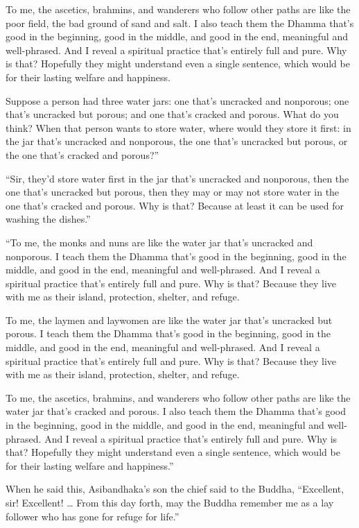 \documentclass[12pt,openany]{book}%
\begin{document}
To me, the ascetics, brahmins, and wanderers who follow other paths are like the poor field, the bad ground of sand and salt. I also teach them the Dhamma that’s good in the beginning, good in the middle, and good in the end, meaningful and well-phrased. And I reveal a spiritual practice that’s entirely full and pure. Why is that? Hopefully they might understand even a single sentence, which would be for their lasting welfare and happiness. 

Suppose a person had three water jars: one that’s uncracked and nonporous; one that’s uncracked but porous; and one that’s cracked and porous. What do you think? When that person wants to store water, where would they store it first: in the jar that’s uncracked and nonporous, the one that’s uncracked but porous, or the one that’s cracked and porous?” 

“Sir, they’d store water first in the jar that’s uncracked and nonporous, then the one that’s uncracked but porous, then they may or may not store water in the one that’s cracked and porous. Why is that? Because at least it can be used for washing the dishes.” 

“To me, the monks and nuns are like the water jar that’s uncracked and nonporous. I teach them the Dhamma that’s good in the beginning, good in the middle, and good in the end, meaningful and well-phrased. And I reveal a spiritual practice that’s entirely full and pure. Why is that? Because they live with me as their island, protection, shelter, and refuge. 

To me, the laymen and laywomen are like the water jar that’s uncracked but porous. I teach them the Dhamma that’s good in the beginning, good in the middle, and good in the end, meaningful and well-phrased. And I reveal a spiritual practice that’s entirely full and pure. Why is that? Because they live with me as their island, protection, shelter, and refuge. 

To me, the ascetics, brahmins, and wanderers who follow other paths are like the water jar that’s cracked and porous. I also teach them the Dhamma that’s good in the beginning, good in the middle, and good in the end, meaningful and well-phrased. And I reveal a spiritual practice that’s entirely full and pure. Why is that? Hopefully they might understand even a single sentence, which would be for their lasting welfare and happiness.” 

When he said this, Asibandhaka’s son the chief said to the Buddha, “Excellent, sir! Excellent! … From this day forth, may the Buddha remember me as a lay follower who has gone for refuge for life.” 
\end{document}
